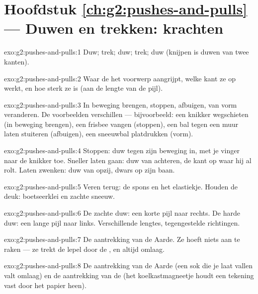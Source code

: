 \section*{Hoofdstuk \ref{ch:g2:pushes-and-pulls} --- Duwen en trekken: krachten}

\begin{solution}{exo:g2:pushes-and-pulls:1}
Duw; trek; duw; trek; duw (knijpen is duwen van twee kanten).
\end{solution}

\begin{solution}{exo:g2:pushes-and-pulls:2}
Waar de  het voorwerp aangrijpt, welke kant ze op werkt, en hoe
sterk ze is (aan de lengte van de pijl).
\end{solution}

\begin{solution}{exo:g2:pushes-and-pulls:3}
In beweging brengen, stoppen, afbuigen, van vorm veranderen. De
voorbeelden verschillen --- bijvoorbeeld: een knikker wegschieten (in
beweging brengen), een frisbee vangen (stoppen), een bal tegen een
muur laten stuiteren (afbuigen), een sneeuwbal platdrukken (vorm).
\end{solution}

\begin{solution}{exo:g2:pushes-and-pulls:4}
Stoppen: duw tegen zijn beweging in, met je vinger naar de knikker
toe. Sneller laten gaan: duw van achteren, de kant op waar hij al
rolt. Laten zwenken: duw van opzij, dwars op zijn baan.
\end{solution}

\begin{solution}{exo:g2:pushes-and-pulls:5}
Veren terug: de spons en het elastiekje. Houden de deuk: boetseerklei
en zachte sneeuw.
\end{solution}

\begin{solution}{exo:g2:pushes-and-pulls:6}
De zachte duw: een korte pijl naar rechts. De harde duw: een lange
pijl naar links. Verschillende lengtes, tegengestelde richtingen.
\end{solution}

\begin{solution}{exo:g2:pushes-and-pulls:7}
De aantrekking van de Aarde. Ze hoeft niets aan te raken --- ze trekt
de lepel door de , en altijd omlaag.
\end{solution}

\begin{solution}{exo:g2:pushes-and-pulls:8}
De aantrekking van de Aarde (een sok die je laat vallen valt omlaag)
en de aantrekking van de  (het koelkastmagneetje houdt een
tekening vast door het papier heen).
\end{solution}

